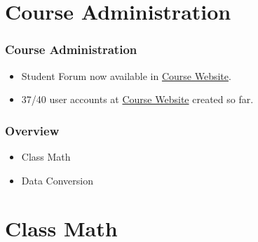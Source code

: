 \documentclass[10pt, compress]{beamer}
\begin{document}
\prepareCover

\section{Course Administration}

\begin{frame}[fragile]
\frametitle{Course Administration}
	\begin{itemize}
		\item[] Student Forum now available in \href{http://www.ghorbanzade.com}{Course Website}.
		\item[] 37/40 user accounts at \href{http://www.ghorbanzade.com}{Course Website} created so far.
	\end{itemize}
\end{frame}

\begin{frame}[fragile]
	\frametitle{Overview}
	\begin{itemize}
		\item[] Class Math
		\item[] Data Conversion
	\end{itemize}
\end{frame}

\section{Class Math}
\end{document}

